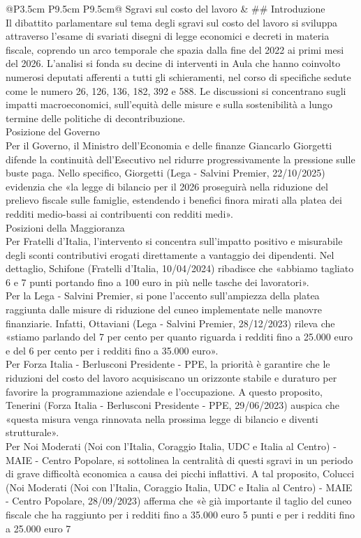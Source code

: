 \documentclass[a4paper,11pt]{article}
\begin{document}
\begin{landscape}
\begin{longtable}{@{}P{3.5cm} P{9.5cm} P{9.5cm}@{}}
\midrule
Sgravi sul costo del lavoro & \#\# Introduzione\\[6pt] Il dibattito parlamentare sul tema degli sgravi sul costo del lavoro si sviluppa attraverso l'esame di svariati disegni di legge economici e decreti in materia fiscale, coprendo un arco temporale che spazia dalla fine del 2022 ai primi mesi del 2026. L'analisi si fonda su decine di interventi in Aula che hanno coinvolto numerosi deputati afferenti a tutti gli schieramenti, nel corso di specifiche sedute come le numero 26, 126, 136, 182, 392 e 588. Le discussioni si concentrano sugli impatti macroeconomici, sull'equità delle misure e sulla sostenibilità a lungo termine delle politiche di decontribuzione.\\[6pt] Posizione del Governo\\[6pt] Per il Governo, il Ministro dell'Economia e delle finanze Giancarlo Giorgetti difende la continuità dell'Esecutivo nel ridurre progressivamente la pressione sulle buste paga. Nello specifico, Giorgetti (Lega - Salvini Premier, 22/10/2025) evidenzia che «la legge di bilancio per il 2026 proseguirà nella riduzione del prelievo fiscale sulle famiglie, estendendo i benefici finora mirati alla platea dei redditi medio-bassi ai contribuenti con redditi medi».\\[6pt] Posizioni della Maggioranza\\[6pt] Per Fratelli d'Italia, l'intervento si concentra sull'impatto positivo e misurabile degli sconti contributivi erogati direttamente a vantaggio dei dipendenti. Nel dettaglio, Schifone (Fratelli d'Italia, 10/04/2024) ribadisce che «abbiamo tagliato 6 e 7 punti portando fino a 100 euro in più nelle tasche dei lavoratori».\\[6pt] Per la Lega - Salvini Premier, si pone l'accento sull'ampiezza della platea raggiunta dalle misure di riduzione del cuneo implementate nelle manovre finanziarie. Infatti, Ottaviani (Lega - Salvini Premier, 28/12/2023) rileva che «stiamo parlando del 7 per cento per quanto riguarda i redditi fino a 25.000 euro e del 6 per cento per i redditi fino a 35.000 euro».\\[6pt] Per Forza Italia - Berlusconi Presidente - PPE, la priorità è garantire che le riduzioni del costo del lavoro acquisiscano un orizzonte stabile e duraturo per favorire la programmazione aziendale e l'occupazione. A questo proposito, Tenerini (Forza Italia - Berlusconi Presidente - PPE, 29/06/2023) auspica che «questa misura venga rinnovata nella prossima legge di bilancio e diventi strutturale».\\[6pt] Per Noi Moderati (Noi con l'Italia, Coraggio Italia, UDC e Italia al Centro) - MAIE - Centro Popolare, si sottolinea la centralità di questi sgravi in un periodo di grave difficoltà economica a causa dei picchi inflattivi. A tal proposito, Colucci (Noi Moderati (Noi con l'Italia, Coraggio Italia, UDC e Italia al Centro) - MAIE - Centro Popolare, 28/09/2023) afferma che «è già importante il taglio del cuneo fiscale che ha raggiunto per i redditi fino a 35.000 euro 5 punti e per i redditi fino a 25.000 euro 7 
\end{longtable}
\end{landscape}
\end{document}
